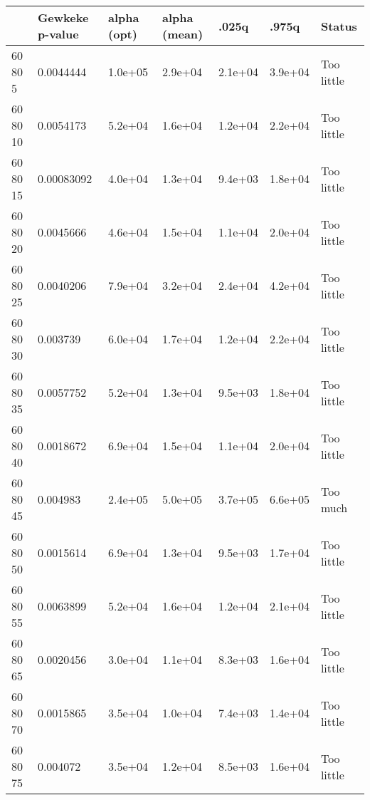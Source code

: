 \begin{tabular}{lllllll}
& Gewkeke p-value & alpha (opt) & alpha (mean) & .025q & .975q & Status \\ 
\hline 
60  80   5 & 0.0044444 & 1.0e+05 & 2.9e+04 & 2.1e+04 & 3.9e+04 & Too little \\ \hline 
60  80  10 & 0.0054173 & 5.2e+04 & 1.6e+04 & 1.2e+04 & 2.2e+04 & Too little \\ \hline 
60  80  15 & 0.00083092 & 4.0e+04 & 1.3e+04 & 9.4e+03 & 1.8e+04 & Too little \\ \hline 
60  80  20 & 0.0045666 & 4.6e+04 & 1.5e+04 & 1.1e+04 & 2.0e+04 & Too little \\ \hline 
60  80  25 & 0.0040206 & 7.9e+04 & 3.2e+04 & 2.4e+04 & 4.2e+04 & Too little \\ \hline 
60  80  30 & 0.003739 & 6.0e+04 & 1.7e+04 & 1.2e+04 & 2.2e+04 & Too little \\ \hline 
60  80  35 & 0.0057752 & 5.2e+04 & 1.3e+04 & 9.5e+03 & 1.8e+04 & Too little \\ \hline 
60  80  40 & 0.0018672 & 6.9e+04 & 1.5e+04 & 1.1e+04 & 2.0e+04 & Too little \\ \hline 
60  80  45 & 0.004983 & 2.4e+05 & 5.0e+05 & 3.7e+05 & 6.6e+05 & Too much \\ \hline 
60  80  50 & 0.0015614 & 6.9e+04 & 1.3e+04 & 9.5e+03 & 1.7e+04 & Too little \\ \hline 
60  80  55 & 0.0063899 & 5.2e+04 & 1.6e+04 & 1.2e+04 & 2.1e+04 & Too little \\ \hline 
60  80  65 & 0.0020456 & 3.0e+04 & 1.1e+04 & 8.3e+03 & 1.6e+04 & Too little \\ \hline 
60  80  70 & 0.0015865 & 3.5e+04 & 1.0e+04 & 7.4e+03 & 1.4e+04 & Too little \\ \hline 
60  80  75 & 0.004072 & 3.5e+04 & 1.2e+04 & 8.5e+03 & 1.6e+04 & Too little \\ \hline 
\hline 
\end{tabular}